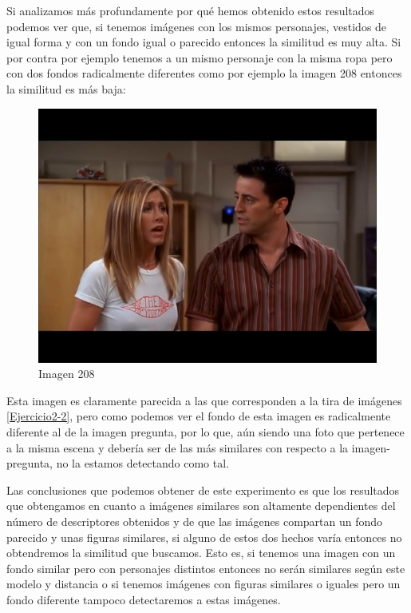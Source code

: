 \documentclass[12pt,a4paper]{article}
\begin{document}
\vspace{10px}

Si analizamos más profundamente por qué hemos obtenido estos resultados podemos ver que, si tenemos imágenes con los mismos personajes, vestidos de igual forma y con un fondo igual o parecido entonces la similitud es muy alta. Si por contra por ejemplo tenemos a un mismo personaje con la misma ropa pero con dos fondos radicalmente diferentes como por ejemplo la imagen 208 entonces la similitud es más baja:

\begin{figure}[H]
  \centering
  \includegraphics[scale=0.35]{./Imagenes/208.png}
  \caption{Imagen 208}
	\label{208}
\end{figure}

Esta imagen es claramente parecida a las que corresponden a la tira de imágenes \ref{Ejercicio2-2}, pero como podemos ver el fondo de esta imagen es radicalmente diferente al de la imagen pregunta, por lo que, aún siendo una foto que pertenece a la misma escena y debería ser de las más similares con respecto a la imagen-pregunta, no la estamos detectando como tal.

\vspace{10px}

Las conclusiones que podemos obtener de este experimento es que los resultados que obtengamos en cuanto a imágenes similares son altamente dependientes del número de descriptores obtenidos y de que las imágenes compartan un fondo parecido y unas figuras similares, si alguno de estos dos hechos varía entonces no obtendremos la similitud que buscamos. Esto es, si tenemos una imagen con un fondo similar pero con personajes distintos entonces no serán similares según este modelo y distancia o si tenemos imágenes con figuras similares o iguales pero un fondo diferente tampoco detectaremos a estas imágenes.
\end{document}
